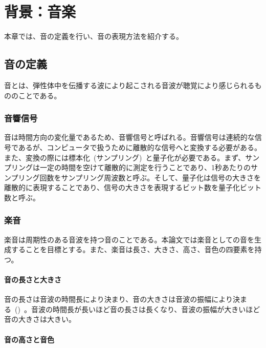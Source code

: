 \chapter{背景：音楽}

本章では、音の定義を行い、音の表現方法を紹介する。

\section{音の定義}

音とは、弾性体中を伝播する波により起こされる音波が聴覚により感じられるもののことである。

\subsection{音響信号}

音は時間方向の変化量であるため、音響信号と呼ばれる。音響信号は連続的な信号であるが、コンピュータで扱うために離散的な信号へと変換する必要がある。また、変換の際には標本化~(サンプリング)~と量子化が必要である。まず、サンプリングは一定の時間を空けて離散的に測定を行うことであり、1秒あたりのサンプリング回数をサンプリング周波数と呼ぶ。そして、量子化は信号の大きさを離散的に表現することであり、信号の大きさを表現するビット数を量子化ビット数と呼ぶ。

\subsection{楽音}

楽音は周期性のある音波を持つ音のことである。本論文では楽音としての音を生成することを目標とする。また、楽音は長さ、大きさ、高さ、音色の四要素を持つ。

\subsubsection{音の長さと大きさ}

音の長さは音波の時間長により決まり、音の大きさは音波の振幅により決まる~()~。音波の時間長が長いほど音の長さは長くなり、音波の振幅が大きいほど音の大きさは大きい。

\subsubsection{音の高さと音色}

